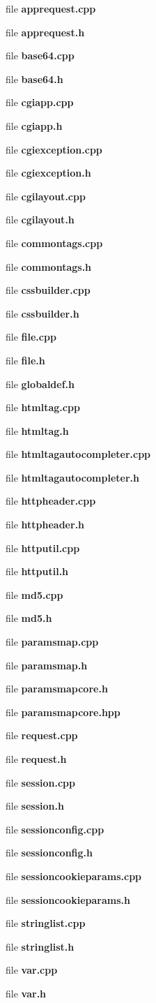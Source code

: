 \begin{CompactItemize}
\item 
file \textbf{apprequest.cpp}
\item 
file \textbf{apprequest.h}
\item 
file \textbf{base64.cpp}
\item 
file \textbf{base64.h}
\item 
file \textbf{cgiapp.cpp}
\item 
file \textbf{cgiapp.h}
\item 
file \textbf{cgiexception.cpp}
\item 
file \textbf{cgiexception.h}
\item 
file \textbf{cgilayout.cpp}
\item 
file \textbf{cgilayout.h}
\item 
file \textbf{commontags.cpp}
\item 
file \textbf{commontags.h}
\item 
file \textbf{cssbuilder.cpp}
\item 
file \textbf{cssbuilder.h}
\item 
file \textbf{file.cpp}
\item 
file \textbf{file.h}
\item 
file \textbf{globaldef.h}
\item 
file \textbf{htmltag.cpp}
\item 
file \textbf{htmltag.h}
\item 
file \textbf{htmltagautocompleter.cpp}
\item 
file \textbf{htmltagautocompleter.h}
\item 
file \textbf{httpheader.cpp}
\item 
file \textbf{httpheader.h}
\item 
file \textbf{httputil.cpp}
\item 
file \textbf{httputil.h}
\item 
file \textbf{md5.cpp}
\item 
file \textbf{md5.h}
\item 
file \textbf{paramsmap.cpp}
\item 
file \textbf{paramsmap.h}
\item 
file \textbf{paramsmapcore.h}
\item 
file \textbf{paramsmapcore.hpp}
\item 
file \textbf{request.cpp}
\item 
file \textbf{request.h}
\item 
file \textbf{session.cpp}
\item 
file \textbf{session.h}
\item 
file \textbf{sessionconfig.cpp}
\item 
file \textbf{sessionconfig.h}
\item 
file \textbf{sessioncookieparams.cpp}
\item 
file \textbf{sessioncookieparams.h}
\item 
file \textbf{stringlist.cpp}
\item 
file \textbf{stringlist.h}
\item 
file \textbf{var.cpp}
\item 
file \textbf{var.h}
\end{CompactItemize}
